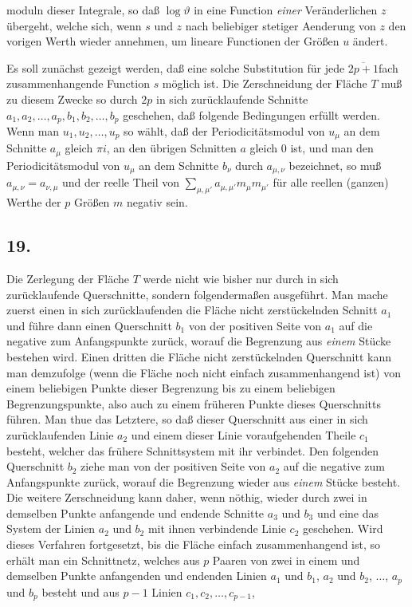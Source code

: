 \documentclass{article}
\begin{document}
moduln dieser Integrale, so daß $\log\vartheta$ in eine Function \emph{einer} Veränderlichen $z$ übergeht, welche sich, wenn $s$ und $z$ nach beliebiger stetiger Aenderung von $z$ den vorigen Werth wieder annehmen, um lineare Functionen der Größen $u$ ändert.

Es soll zunächst gezeigt werden, daß eine solche Substitution für jede $\overline{2p+1}$fach zusammenhangende Function $s$ möglich ist. Die Zerschneidung der Fläche $T$ muß zu diesem Zwecke so durch $2p$ in sich zurücklaufende Schnitte $a_{1}, a_{2}, \ldots, a_{p}, b_{1}, b_{2}, \ldots, b_{p}$ geschehen, daß folgende Bedingungen erfüllt werden. Wenn man $u_{1}, u_{2}, \ldots, u_{p}$ so wählt, daß der Periodicitätsmodul von $u_{\mu}$ an dem Schnitte $a_{\mu}$ gleich $\pi i$, an den übrigen Schnitten $a$ gleich 0 ist, und man den Periodicitätsmodul von $u_{\mu}$ an dem Schnitte $b_{\nu}$ durch $a_{\mu,\nu}$ bezeichnet, so muß $a_{\mu,\nu} = a_{\nu,\mu}$ und der reelle Theil von $\displaystyle\sum_{\mu,\mu'} a_{\mu,\mu'} m_{\mu} m_{\mu'}$ für alle reellen (ganzen) Werthe der $p$ Größen $m$ negativ sein.

\subsection*{19.}

Die Zerlegung der Fläche $T$ werde nicht wie bisher nur durch in sich zurücklaufende Querschnitte, sondern folgendermaßen ausgeführt. Man mache zuerst einen in sich zurücklaufenden die Fläche nicht zerstückelnden Schnitt $a_{1}$ und führe dann einen Querschnitt $b_{1}$ von der positiven Seite von $a_{1}$ auf die negative zum Anfangspunkte zurück, worauf die Begrenzung aus \emph{einem} Stücke bestehen wird. Einen dritten die Fläche nicht zerstückelnden Querschnitt kann man demzufolge (wenn die Fläche noch nicht einfach zusammenhangend ist) von einem beliebigen Punkte dieser Begrenzung bis zu einem beliebigen Begrenzungspunkte, also auch zu einem früheren Punkte dieses Querschnitts führen. Man thue das Letztere, so daß dieser Querschnitt aus einer in sich zurücklaufenden Linie $a_{2}$ und einem dieser Linie voraufgehenden Theile $c_{1}$ besteht, welcher das frühere Schnittsystem mit ihr verbindet. Den folgenden Querschnitt $b_{2}$ ziehe man von der positiven Seite von $a_{2}$ auf die negative zum Anfangspunkte zurück, worauf die Begrenzung wieder aus \emph{einem} Stücke besteht. Die weitere Zerschneidung kann daher, wenn nöthig, wieder durch zwei in demselben Punkte anfangende und endende Schnitte $a_{3}$ und $b_{3}$ und eine das System der Linien $a_{2}$ und $b_{2}$ mit ihnen verbindende Linie $c_{2}$ geschehen. Wird dieses Verfahren fortgesetzt, bis die Fläche einfach zusammenhangend ist, so erhält man ein Schnittnetz, welches aus $p$ Paaren von zwei in einem und demselben Punkte anfangenden und endenden Linien $a_{1}$ und $b_{1}$, $a_{2}$ und $b_{2}$, $\ldots$, $a_{p}$ und $b_{p}$ besteht und aus $p-1$ Linien $c_{1}, c_{2}, \ldots, c_{p-1}$,
\end{document}
